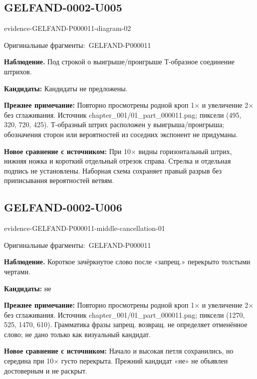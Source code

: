 \documentclass[11pt]{article}
\newcommand{\EvidenceBlock}[4]{%
 \par\smallskip\noindent\begin{minipage}{\linewidth}
 \begin{minipage}[t]{.47\linewidth}\vspace{0pt}\centering
 \csname evidence-#1-#2\endcsname\par
 {\scriptsize\SourceCropCaption\ #1}\par
 \end{minipage}\hfill
 \begin{minipage}[t]{.49\linewidth}\vspace{0pt}\raggedright
 {\small\color{orange!65!black}\textbf{#4} #3}\par
 \end{minipage}
 \end{minipage}\par\smallskip}
\newcommand{\SourceCropCaption}{Оригинальные фрагменты:}\newcommand{\ReadingCaption}{Сомнительное чтение.}\newcommand{\IncompleteCaption}{Неразобранный фрагмент.}\newcommand{\DiagramCaption}{Рисунок и набранное описание.}
\begin{document}
\subsection*{GELFAND-0002-U005}
\EvidenceBlock{GELFAND-P000011}{diagram-02}{Под строкой о выигрыше/проигрыше Т-образное соединение штрихов.}{Наблюдение.}
\par\smallskip\noindent\textbf{Кандидаты: } Кандидаты не предложены.\par
\par\smallskip\noindent\textbf{Прежнее примечание: } Повторно просмотрены родной кроп 1× и увеличение 2× без сглаживания. Источник chapter\_001/01\_part\_000011.png; пиксели (495, 320, 720, 425). Т-образный штрих расположен у выигрыша/проигрыша; обозначения сторон или вероятностей из соседних экспонент не придуманы.\par
\par\smallskip\noindent\textbf{Новое сравнение с источником: } При 10× видны горизонтальный штрих, нижняя ножка и короткий отдельный отрезок справа. Стрелка и отдельная подпись не установлены. Наборная схема сохраняет правый разрыв без приписывания вероятностей ветвям.\par

\subsection*{GELFAND-0002-U006}
\EvidenceBlock{GELFAND-P000011}{middle-cancellation-01}{Короткое зачёркнутое слово после «запрещ.» перекрыто толстыми чертами.}{Наблюдение.}
\par\smallskip\noindent\textbf{Кандидаты: } не\par
\par\smallskip\noindent\textbf{Прежнее примечание: } Повторно просмотрены родной кроп 1× и увеличение 2× без сглаживания. Источник chapter\_001/01\_part\_000011.png; пиксели (1270, 525, 1470, 610). Грамматика фразы запрещ. возвращ. не определяет отменённое слово; не дано только как визуальный кандидат.\par
\par\smallskip\noindent\textbf{Новое сравнение с источником: } Начало и высокая петля сохранились, но середина при 10× густо перекрыта. Прежний кандидат «не» не объявлен достоверным и не раскрыт.\par
\end{document}
